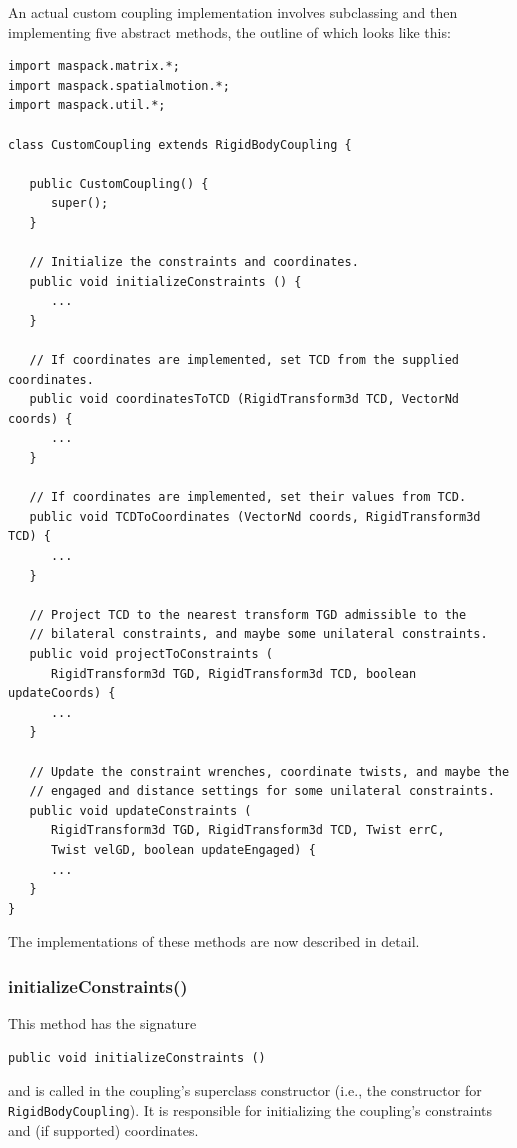 An actual custom coupling implementation involves subclassing
 and then
implementing five abstract methods, the outline of which looks like
this:
%
\begin{lstlisting}[]
import maspack.matrix.*;
import maspack.spatialmotion.*;
import maspack.util.*;

class CustomCoupling extends RigidBodyCoupling {

   public CustomCoupling() {
      super();
   }

   // Initialize the constraints and coordinates.
   public void initializeConstraints () {
      ...
   }

   // If coordinates are implemented, set TCD from the supplied coordinates.
   public void coordinatesToTCD (RigidTransform3d TCD, VectorNd coords) {
      ...
   }

   // If coordinates are implemented, set their values from TCD.
   public void TCDToCoordinates (VectorNd coords, RigidTransform3d TCD) {
      ...
   }

   // Project TCD to the nearest transform TGD admissible to the
   // bilateral constraints, and maybe some unilateral constraints.
   public void projectToConstraints (
      RigidTransform3d TGD, RigidTransform3d TCD, boolean updateCoords) {
      ...
   }

   // Update the constraint wrenches, coordinate twists, and maybe the 
   // engaged and distance settings for some unilateral constraints.
   public void updateConstraints (
      RigidTransform3d TGD, RigidTransform3d TCD, Twist errC,
      Twist velGD, boolean updateEngaged) {
      ...
   }
}
\end{lstlisting}
%
The implementations of these methods are now described in detail.

\subsubsection*{initializeConstraints()}

This method has the signature
\begin{lstlisting}[]
  public void initializeConstraints ()
\end{lstlisting}
%
and is called in the coupling's superclass constructor (i.e., the
constructor for {\tt RigidBodyCoupling}).  It is responsible for
initializing the coupling's constraints and (if supported)
coordinates. 

